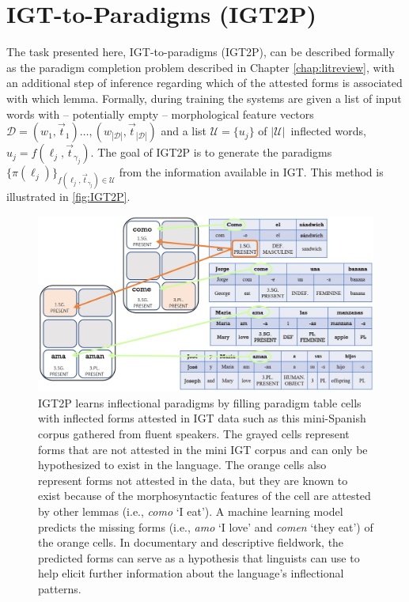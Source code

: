 \section{IGT-to-Paradigms (IGT2P)}

The task presented here, IGT-to-paradigms (IGT2P), can be described formally as the paradigm completion problem described in Chapter \ref{chap:litreview}, with an additional step of inference regarding which of the attested forms is associated with which lemma.  
Formally, during training the systems are given a list of input words with -- potentially empty -- morphological feature vectors $\mathcal{D}=(w_1,\vec{t}_1) \dots, (w_{|\mathcal{D}|}, \vec{t}_{|\mathcal{D}|})$ and a list $\mathcal{U} = \{u_j\}$ of $|\mathcal{U}|$~inflected words, $u_j = f(\ell_j, \vec{t}_{\gamma_j})$. The goal of IGT2P is to generate the paradigms 
$\{\pi(\ell_j)\}_{f(\ell_j, \vec{t}_{\gamma_j})\in\mathcal{U}}$ from the information available in IGT. This method is illustrated in \autoref{fig:IGT2P}.

\begin{figure}[!tb]
    \centering
    \includegraphics[width=16cm]{figs/IGT2P.jpg}
    \caption[IGT2P]{IGT2P learns inflectional paradigms by filling paradigm table cells with inflected forms attested in IGT data such as this mini-Spanish corpus gathered from fluent speakers. The grayed cells represent forms that are not attested in the mini IGT corpus and can only be hypothesized to exist in the language. The orange cells also represent forms not attested in the data, but they are known to exist because of the morphosyntactic features of the cell are attested by other lemmas (i.e., \textit{como} `I eat'). A machine learning model predicts the missing forms (i.e., \textit{amo} `I love' and \textit{comen} `they eat') of the orange cells. In documentary and descriptive fieldwork, the predicted forms can serve as a hypothesis that linguists can use to help elicit further information about the language's inflectional patterns.}
    \label{fig:IGT2P}
\end{figure}

